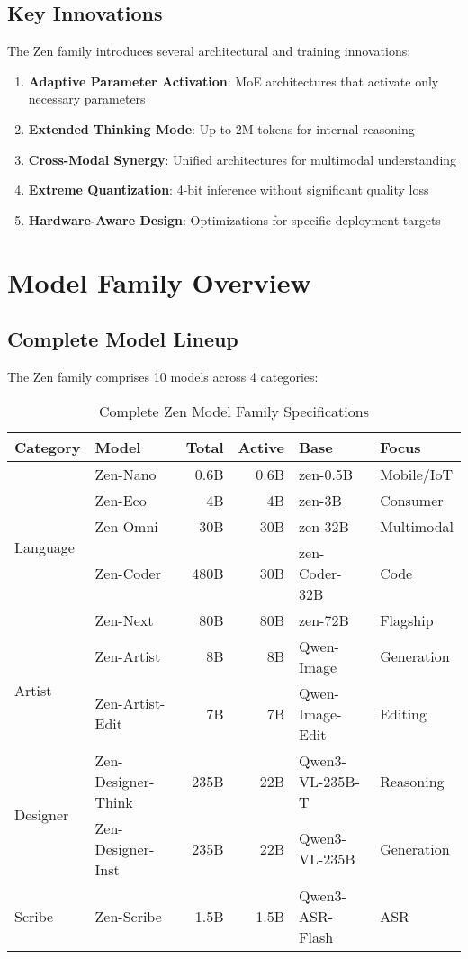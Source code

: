 \documentclass[11pt,a4paper]{article}
\begin{document}
\subsection{Key Innovations}

The Zen family introduces several architectural and training innovations:
\begin{enumerate}
    \item \textbf{Adaptive Parameter Activation}: MoE architectures that activate only necessary parameters
    \item \textbf{Extended Thinking Mode}: Up to 2M tokens for internal reasoning
    \item \textbf{Cross-Modal Synergy}: Unified architectures for multimodal understanding
    \item \textbf{Extreme Quantization}: 4-bit inference without significant quality loss
    \item \textbf{Hardware-Aware Design}: Optimizations for specific deployment targets
\end{enumerate}

\section{Model Family Overview}

\subsection{Complete Model Lineup}

The Zen family comprises 10 models across 4 categories:

\begin{table}[H]
\centering
\small
\begin{tabular}{llrrll}
\toprule
\textbf{Category} & \textbf{Model} & \textbf{Total} & \textbf{Active} & \textbf{Base} & \textbf{Focus} \\
\midrule
\multirow{5}{*}{Language} 
    & Zen-Nano & 0.6B & 0.6B & zen-0.5B & Mobile/IoT \\
    & Zen-Eco & 4B & 4B & zen-3B & Consumer \\
    & Zen-Omni & 30B & 30B & zen-32B & Multimodal \\
    & Zen-Coder & 480B & 30B & zen-Coder-32B & Code \\
    & Zen-Next & 80B & 80B & zen-72B & Flagship \\
\midrule
\multirow{2}{*}{Artist} 
    & Zen-Artist & 8B & 8B & Qwen-Image & Generation \\
    & Zen-Artist-Edit & 7B & 7B & Qwen-Image-Edit & Editing \\
\midrule
\multirow{2}{*}{Designer} 
    & Zen-Designer-Think & 235B & 22B & Qwen3-VL-235B-T & Reasoning \\
    & Zen-Designer-Inst & 235B & 22B & Qwen3-VL-235B & Generation \\
\midrule
Scribe & Zen-Scribe & 1.5B & 1.5B & Qwen3-ASR-Flash & ASR \\
\bottomrule
\end{tabular}
\caption{Complete Zen Model Family Specifications}
\end{table}
\end{document}
